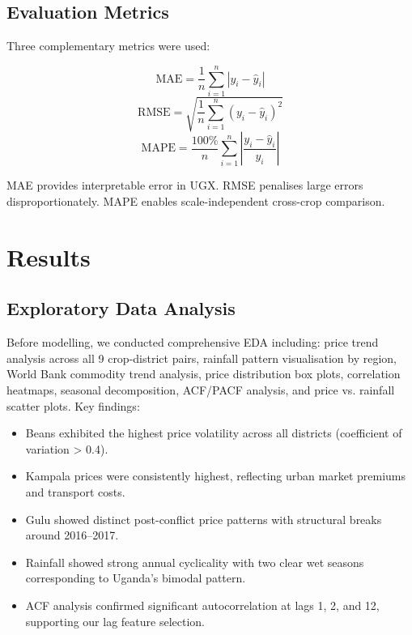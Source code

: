 \documentclass[12pt,a4paper]{article}
\begin{document}
\subsection{Evaluation Metrics}
Three complementary metrics were used:

\begin{equation}
    \text{MAE} = \frac{1}{n}\sum_{i=1}^{n}|y_i - \hat{y}_i|
\end{equation}
\begin{equation}
    \text{RMSE} = \sqrt{\frac{1}{n}\sum_{i=1}^{n}(y_i - \hat{y}_i)^2}
\end{equation}
\begin{equation}
    \text{MAPE} = \frac{100\%}{n}\sum_{i=1}^{n}\left|\frac{y_i - \hat{y}_i}{y_i}\right|
\end{equation}

MAE provides interpretable error in UGX. RMSE penalises large errors disproportionately. MAPE enables scale-independent cross-crop comparison.

\section{Results}

\subsection{Exploratory Data Analysis}
Before modelling, we conducted comprehensive EDA including: price trend analysis across all 9 crop-district pairs, rainfall pattern visualisation by region, World Bank commodity trend analysis, price distribution box plots, correlation heatmaps, seasonal decomposition, ACF/PACF analysis, and price vs. rainfall scatter plots. Key findings:

\begin{itemize}
    \item Beans exhibited the highest price volatility across all districts (coefficient of variation > 0.4).
    \item Kampala prices were consistently highest, reflecting urban market premiums and transport costs.
    \item Gulu showed distinct post-conflict price patterns with structural breaks around 2016--2017.
    \item Rainfall showed strong annual cyclicality with two clear wet seasons corresponding to Uganda's bimodal pattern.
    \item ACF analysis confirmed significant autocorrelation at lags 1, 2, and 12, supporting our lag feature selection.
\end{itemize}
\end{document}
